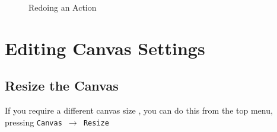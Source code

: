 \documentclass[a4paper]{article}
\begin{document}
\begin{figure}[H] \begin{center} 
\label{fig:redo}
\caption{Redoing an Action}
\vspace{-20pt}
\end{center} \end{figure} 

\section{Editing Canvas Settings}
\subsection{Resize the Canvas} 
If you require a different canvas size , you can do this from the top menu, pressing \texttt{Canvas $\rightarrow$ Resize}
\end{document}
